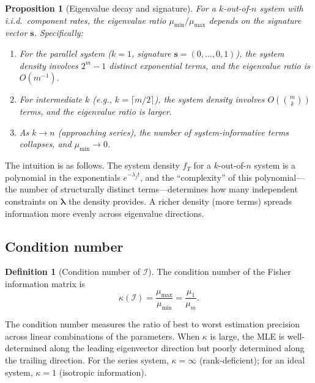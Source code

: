 \documentclass[12pt]{article}
\newtheorem{proposition}[theorem]{Proposition}
\theoremstyle{definition}
\newtheorem{definition}[theorem]{Definition}
\theoremstyle{remark}
\newcommand{\blam}{\boldsymbol{\lambda}}
\begin{document}
\begin{proposition}[Eigenvalue decay and signature]
\label{prop:ev-decay}
For a $k$-out-of-$n$ system with i.i.d.\ component rates, the
eigenvalue ratio $\mu_{\min} / \mu_{\max}$ depends on the signature
vector $\mathbf{s}$.  Specifically:
\begin{enumerate}[label=(\roman*)]
  \item For the parallel system ($k = 1$, signature
    $\mathbf{s} = (0, \ldots, 0, 1)$), the system density involves
    $2^m - 1$ distinct exponential terms, and the eigenvalue ratio
    is $O(m^{-1})$.
  \item For intermediate $k$ (e.g., $k = \lceil m/2 \rceil$), the
    system density involves $O(\binom{m}{k})$ terms, and the
    eigenvalue ratio is larger.
  \item As $k \to n$ (approaching series), the number of
    system-informative terms collapses, and $\mu_{\min} \to 0$.
\end{enumerate}
\end{proposition}

The intuition is as follows.  The system density $f_T$ for a
$k$-out-of-$n$ system is a polynomial in the exponentials
$e^{-\lambda_j t}$, and the ``complexity'' of this polynomial---the
number of structurally distinct terms---determines how many independent
constraints on $\blam$ the density provides.  A richer density
(more terms) spreads information more evenly across eigenvalue
directions.

\subsection{Condition number}
\label{sec:condition-number}

\begin{definition}[Condition number of $\mathcal{I}$]
\label{def:condition-number}
The condition number of the Fisher information matrix is
\begin{equation}\label{eq:condition-number}
  \kappa(\mathcal{I}) = \frac{\mu_{\max}}{\mu_{\min}}
  = \frac{\mu_1}{\mu_m}.
\end{equation}
\end{definition}

The condition number measures the ratio of best to worst estimation
precision across linear combinations of the parameters.  When
$\kappa$ is large, the MLE is well-determined along the leading
eigenvector direction but poorly determined along the trailing
direction.  For the series system, $\kappa = \infty$
(rank-deficient); for an ideal system, $\kappa = 1$ (isotropic
information).
\end{document}
